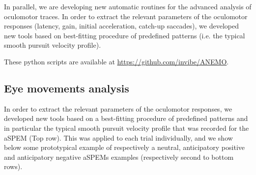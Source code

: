\documentclass[profile,final,english, draft]{article}%
\begin{document}
In parallel, we are developing new automatic routines for the advanced analysis of oculomotor traces. In order to extract the relevant parameters of the oculomotor responses (latency, gain, initial acceleration, catch-up saccades), we developed new tools based on best-fitting procedure of predefined patterns (i.e. the typical smooth pursuit velocity profile).

These python scripts are available at \url{https://github.com/invibe/ANEMO}.


\subsection{Eye movements analysis}

In order to extract the relevant parameters of the oculomotor responses, we developed new tools based on a best-fitting procedure of predefined patterns and in particular the typical smooth pursuit velocity profile that was recorded for the aSPEM (Top row). This was applied to each trial individually, and we show below some prototypical example of respectively a neutral, anticipatory positive and anticipatory negative aSPEMs examples (respectively second to bottom rows). 
\end{document}
